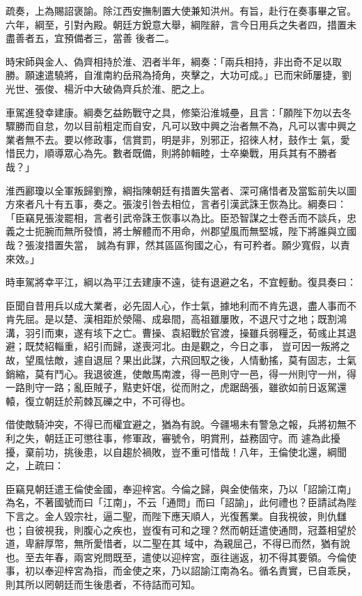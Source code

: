\begin{pinyinscope}
 疏奏，上為賜詔褒諭。除江西安撫制置大使兼知洪州。有旨，赴行在奏事畢之官。六年，綱至，引對內殿。朝廷方銳意大舉，綱陛辭，言今日用兵之失者四，措置未盡善者五，宜預備者三，當善
 後者二。



 時宋師與金人、偽齊相持於淮、泗者半年，綱奏：「兩兵相持，非出奇不足以取勝。願速遣驍將，自淮南約岳飛為掎角，夾擊之，大功可成。」已而宋師屢捷，劉光世、張俊、楊沂中大破偽齊兵於淮、肥之上。



 車駕進發幸建康。綱奏乞益飭戰守之具，修築沿淮城壘，且言：「願陛下勿以去冬驟勝而自怠，勿以目前粗定而自安，凡可以致中興之治者無不為，凡可以害中興之業者無不去。要以修政事，信賞罰，明是非，別邪正，招徠人材，鼓作士
 氣，愛惜民力，順導眾心為先。數者既備，則將帥輯睦，士卒樂戰，用兵其有不勝者哉？」



 淮西酈瓊以全軍叛歸劉豫，綱指陳朝廷有措置失當者、深可痛惜者及當監前失以圖方來者凡十有五事，奏之。張浚引咎去相位，言者引漢武誅王恢為比。綱奏曰：「臣竊見張浚罷相，言者引武帝誅王恢事以為比。臣恐智謀之士卷舌而不談兵，忠義之士扼腕而無所發憤，將士解體而不用命，州郡望風而無堅城，陛下將誰與立國哉？張浚措置失當，
 誠為有罪，然其區區徇國之心，有可矜者。願少寬假，以責來效。」



 時車駕將幸平江，綱以為平江去建康不遠，徒有退避之名，不宜輕動。復具奏曰：



 臣聞自昔用兵以成大業者，必先固人心，作士氣，據地利而不肯先退，盡人事而不肯先屈。是以楚、漢相距於滎陽、成皋間，高祖雖屢敗，不退尺寸之地；既割鴻溝，羽引而東，遂有垓下之亡。曹操、袁紹戰於官渡，操雖兵弱糧乏，荀彧止其退避；既焚紹輜重，紹引而歸，遂喪河北。由是觀之，今日之事，
 豈可因一叛將之故，望風怯敵，遽自退屈？果出此謀，六飛回馭之後，人情動搖，莫有固志，士氣銷縮，莫有鬥心。我退彼進，使敵馬南渡，得一邑則守一邑，得一州則守一州，得一路則守一路；亂臣賊子，黠吏奸氓，從而附之，虎踞鴟張，雖欲如前日返駕還轅，復立朝廷於荊棘瓦礫之中，不可得也。



 借使敵騎沖突，不得已而權宜避之，猶為有說。今疆埸未有警急之報，兵將初無不利之失，朝廷正可懲往事，修軍政，審號令，明賞刑，益務固守。而
 遽為此擾擾，棄前功，挑後患，以自趨於禍敗，豈不重可惜哉！八年，王倫使北還，綱聞之，上疏曰：



 臣竊見朝廷遣王倫使金國，奉迎梓宮。今倫之歸，與金使偕來，乃以「詔諭江南」為名，不著國號而曰「江南」，不云「通問」而曰「詔諭」，此何禮也？臣請試為陛下言之。金人毀宗社，逼二聖，而陛下應天順人，光復舊業。自我視彼，則仇讎也；自彼視我，則腹心之疾也，豈復有可和之理？然而朝廷遣使通問，冠蓋相望於道，卑辭厚幣，無所愛惜者，以二聖在其
 域中，為親屈己，不得已而然，猶有說也。至去年春，兩宮兇問既至，遣使以迎梓宮，亟往遄返，初不得其要領。今倫使事，初以奉迎梓宮為指，而金使之來，乃以詔諭江南為名。循名責實，已自乖戾，則其所以罔朝廷而生後患者，不待詰而可知。




\end{pinyinscope}
